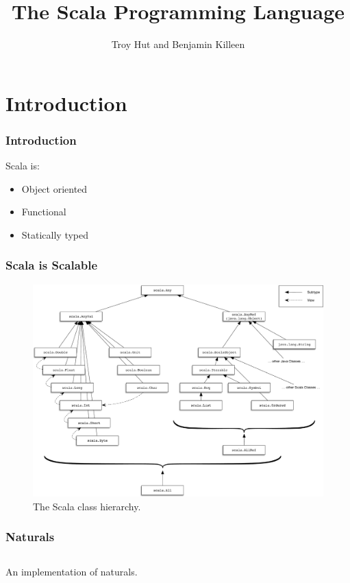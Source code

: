 \documentclass[10pt, usenames, dvipsnames, table]{beamer}
\title{The Scala Programming Language}
\author{Troy Hut and Benjamin Killeen}
\date{}
\begin{document}
\begin{frame}
  \titlepage{}
\end{frame}

\section{Introduction}
\begin{frame}
  \frametitle{Introduction}
  Scala is:
  \begin{itemize}
  \item<2-> Object oriented
  \item<3-> Functional
  \item<4-> Statically typed
  \end{itemize}
\end{frame}

\begin{frame}
  \frametitle{Scala is \textbf{Scalable}}
  \begin{figure}
    \centering
    \includegraphics[width=0.8\linewidth]{scala_classes}
    \caption{The Scala class hierarchy.}
    \label{fig:class_hierarchy}
  \end{figure}
\end{frame}

\begin{frame}
  \frametitle{Naturals}
  \begin{listing}
    \inputminted{Scala}{../examples/nats.scala}
    \caption{An implementation of naturals.}
    \label{lst:nats-example}
  \end{listing}
  
\end{frame}
\end{document}
